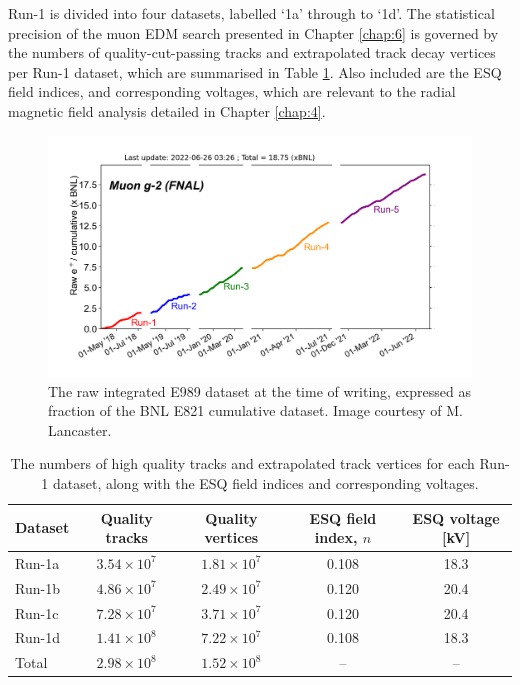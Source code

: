 Run-1 is divided into four datasets, labelled `1a' through to `1d'. The statistical precision of the muon EDM search presented in Chapter \ref{chap:6} is governed by the numbers of quality-cut-passing tracks and extrapolated track decay vertices per Run-1 dataset, which are summarised in Table \ref{tbl:MeasPeriods}. Also included are the ESQ field indices, and corresponding voltages, which are relevant to the radial magnetic field analysis detailed in Chapter \ref{chap:4}. 

\begin{figure}[t!]
\centering{}
\includegraphics[trim={0 0 0 1.5cm},clip,width=\textwidth]{Images/Chapter3/integratedctag.png}
\caption{The raw integrated E989 dataset at the time of writing, expressed as fraction of the BNL E821 cumulative dataset. Image courtesy of M. Lancaster.}
\label{fig:ctag}
\end{figure}

\begin{table}[t!]
\centering
\begin{tabular}{l|cccc}
\hline
\hline
Dataset & Quality tracks & Quality vertices & ESQ field index, $n$ & ESQ voltage [kV] \\
\hline
Run-1a & $3.54\times10^{7}$ & $1.81\times10^{7}$ & 0.108 & 18.3 \\ 
Run-1b & $4.86\times10^{7}$ & $2.49\times10^{7}$ & 0.120 & 20.4 \\
Run-1c & $7.28\times10^{7}$ & $3.71\times10^{7}$ & 0.120 & 20.4 \\
Run-1d & $1.41\times10^{8}$ & $7.22\times10^{7}$ & 0.108 & 18.3 \\
\hdashline
Total & $2.98\times10^{8}$ & $1.52\times10^{8}$ & -- & -- \\ 
\hline
\hline
\end{tabular}
\caption{The numbers of high quality tracks and extrapolated track vertices for each Run-1 dataset, along with the ESQ field indices and corresponding voltages.}
\label{tbl:MeasPeriods}
\end{table}

